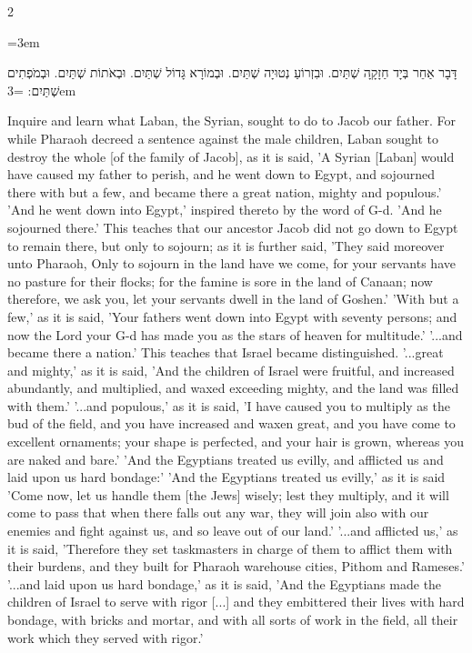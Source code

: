 \documentclass[11pt, openany]{book}
\newenvironment{bilingual}{%
  \par\vspace{4pt}%
  \begin{paracol}{2}%
}{%
  \end{paracol}%
  \par\vspace{2pt}%
}
\newenvironment{hebrewcol}{%
  \switchcolumn[1]%
  \begingroup
  \RTL
  \hebrewfont\large
  \setstretch{1.4}%
  \emergencystretch=3em
  \tolerance=9999
  \parindent=0pt\relax
}{%
  \endRTL
  \endgroup
}
\newenvironment{englishcol}{%
  \switchcolumn[0]%
  \begingroup
  \setstretch{1.4}%
  \emergencystretch=3em
  \tolerance=9999
  \normalsize
  \rightskip=0.12in\relax
}{%
  \endgroup
}
\begin{document}
\begin{bilingual}
\begin{hebrewcol}
דָּבָר אַחֵר בְּיָד חַזָקָָה שְׁתַּיִם. וּבִזְרוֹעַ נְטוּיָה שְׁתַּיִם. וּבְמוֹרָא גָּדוֹל שְׁתַּיִם. וּבְאֹתוֹת שְׁתַּיִם. וּבְמֹפְתִים שְׁתַּיִם:
\end{hebrewcol}
\begin{englishcol}
Inquire and learn what Laban, the Syrian, sought to do to Jacob our father. For while Pharaoh decreed a sentence against the male children, Laban sought to destroy the whole [of the family of Jacob], as it is said, 'A Syrian [Laban] would have caused my father to perish, and he went down to Egypt, and sojourned there with but a few, and became there a great nation, mighty and populous.'
'And he went down into Egypt,' inspired thereto by the word of G-d. 'And he sojourned there.' This teaches that our ancestor Jacob did not go down to Egypt to remain there, but only to sojourn; as it is further said, 'They said moreover unto Pharaoh, Only to sojourn in the land have we come, for your servants have no pasture for their flocks; for the famine is sore in the land of Canaan; now therefore, we ask you, let your servants dwell in the land of Goshen.'
'With but a few,' as it is said, 'Your fathers went down into Egypt with seventy persons; and now the Lord your G-d has made you as the stars of heaven for multitude.'
'...and became there a nation.' This teaches that Israel became distinguished. '...great and mighty,' as it is said, 'And the children of Israel were fruitful, and increased abundantly, and multiplied, and waxed exceeding mighty, and the land was filled with them.' '...and populous,' as it is said, 'I have caused you to multiply as the bud of the field, and you have increased and waxen great, and you have come to excellent ornaments; your shape is perfected, and your hair is grown, whereas you are naked and bare.'
'And the Egyptians treated us evilly, and afflicted us and laid upon us hard bondage:' 'And the Egyptians treated us evilly,' as it is said 'Come now, let us handle them [the Jews] wisely; lest they multiply, and it will come to pass that when there falls out any war, they will join also with our enemies and fight against us, and so leave out of our land.' '...and afflicted us,' as it is said, 'Therefore they set taskmasters in charge of them to afflict them with their burdens,  and they built for Pharaoh warehouse cities, Pithom and Rameses.' '...and laid upon us hard bondage,' as it is said, 'And the Egyptians made the children of Israel to serve with rigor [...] and they embittered their lives with hard bondage, with bricks and mortar, and with all sorts of work in the field, all their work which they served with rigor.'

\end{englishcol}
\end{bilingual}
\end{document}
